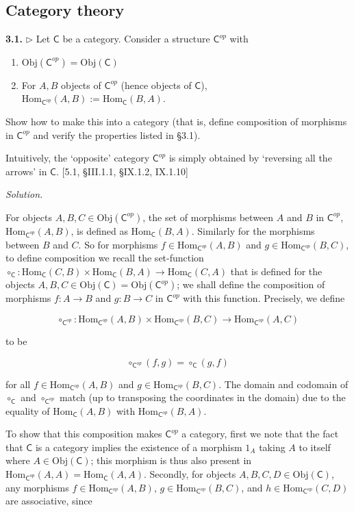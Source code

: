 \documentclass[14pt,parskip=full]{scrartcl}
\newcommand{\exercise}[3]{
\noindent
\textbf{#1.} #2

\noindent
\textit{Solution.}{\let\tpar\par \let\par\relax #3}
}
\newcommand{\Obj}{\mathrm{Obj}}
\newcommand{\Hom}{\mathrm{Hom}}
\begin{document}
\subsection{Category theory}

\exercise
{3.1}{$\rhd$ Let $\mathsf{C}$ be a category. Consider a structure
$\mathsf{C}^{op}$ with
\begin{enumerate}
\item $\Obj(\mathsf{C}^{op}) = \Obj(\mathsf{C})$
\item For $A, B$ objects of $\mathsf{C}^{op}$ (hence objects of $\mathsf{C}$),
$\Hom_{\mathsf{C}^{op}}(A, B) := \Hom_{\mathsf{C}}(B, A)$.
\end{enumerate}
Show how to make this into a category (that is, define composition of morphisms
in $\mathsf{C}^{op}$ and verify the properties listed in \S3.1).

Intuitively, the `opposite' category $\mathsf{C}^{op}$ is simply obtained by
`reversing all the arrows' in $\mathsf{C}$. [5.1, \S III.1.1, \S IX.1.2,
IX.1.10]}{

For objects $A,B,C\in\Obj(\mathsf{C}^{op})$, the set of morphisms between $A$
and $B$ in $\mathsf{C}^{op}$, $\Hom_{\mathsf{C}^{op}}(A,B)$, is defined as
$\Hom_{\mathsf{C}}(B, A)$. Similarly for the morphisms between $B$ and $C$. So
for morphisms $f\in\Hom_{\mathsf{C}^{op}}(A,B)$ and
$g\in\Hom_{\mathsf{C}^{op}}(B,C)$, to define composition we recall the
set-function $\circ_{\mathsf{C}} : \Hom_{\mathsf{C}}(C,B) \times
\Hom_{\mathsf{C}}(B,A) \to\Hom_{\mathsf{C}}(C,A)$ that is defined for the
objects $A,B,C\in\Obj(\mathsf{C})=\Obj(\mathsf{C}^{op})$; we shall define the
composition of morphisms $f:A\to B$ and $g:B\to C$ in $\mathsf{C}^{op}$ with
this function. Precisely, we define

\[ \circ_{\mathsf{C}^{op}}: \Hom_{\mathsf{C}^{op}}(A,B) \times
\Hom_{\mathsf{C}^{op}}(B,C) \to \Hom_{\mathsf{C}^{op}}(A,C) \]

to be

\[ \circ_{\mathsf{C}^{op}}(f,g) = \circ_{\mathsf{C}}(g,f) \]

for all $f\in\Hom_{\mathsf{C}^{op}}(A,B)$ and $g\in\Hom_{\mathsf{C}^{op}}(B,C)$.
The domain and codomain of $\circ_{\mathsf{C}}$ and $\circ_{\mathsf{C}^{op}}$
match (up to transposing the coordinates in the domain) due to the equality of
$\Hom_{\mathsf{C}}(A,B)$ with $\Hom_{\mathsf{C}^{op}}(B,A)$.

\tpar
To show that this composition makes $\mathsf{C}^{op}$ a category, first we note
that the fact that $\mathsf{C}$ is a category implies the existence of a
morphism $1_{A}$ taking $A$ to itself where $A\in\Obj(\mathsf{C})$; this
morphism is thus also present in $\Hom_{\mathsf{C}^{op}}(A,A) =
\Hom_{\mathsf{C}}(A,A)$. Secondly, for objects $A,B,C,D\in\Obj(\mathsf{C})$, any
morphisms $f\in\Hom_{\mathsf{C}^{op}}(A,B)$, $g\in\Hom_{\mathsf{C}^{op}}(B,C)$,
and $h\in\Hom_{\mathsf{C}^{op}}(C,D)$ are associative, since

}
\end{document}
